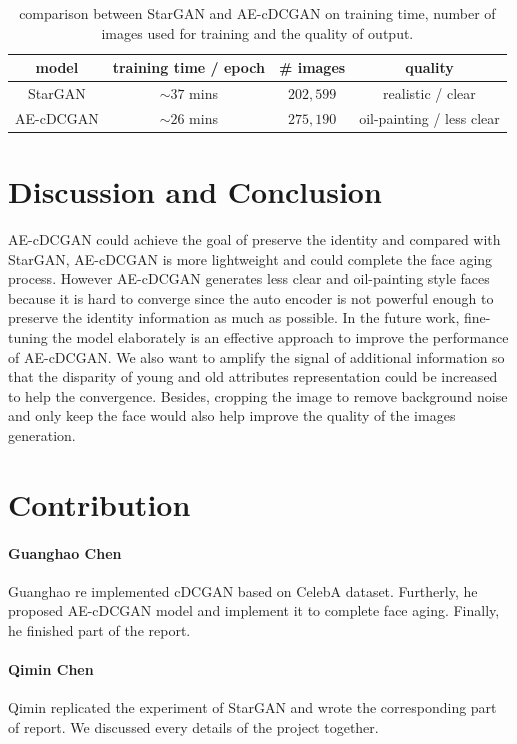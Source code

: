 \documentclass{article}
\begin{document}
\begin{table}[H]
\begin{center}
\setlength{\tabcolsep}{5mm}
\begin{tabular}{c|ccc}
\toprule
model & training time / epoch & \# images & quality \\
\midrule
StarGAN & $\sim 37$ mins & $202,599$ & realistic / clear \\
\midrule
AE-cDCGAN & $\sim 26$ mins & $275,190$ & oil-painting / less clear \\
\bottomrule
\end{tabular}
\caption{comparison between StarGAN and AE-cDCGAN on training time, number of images used for training and the quality of output.}
\label{comparison}
\end{center}
\end{table}

\section{Discussion and Conclusion}
AE-cDCGAN could achieve the goal of preserve the identity and compared with StarGAN, AE-cDCGAN is more lightweight and could complete the face aging process. However AE-cDCGAN generates less clear and oil-painting style faces because it is hard to converge since the auto encoder is not powerful enough to preserve the identity information as much as possible. In the future work, fine-tuning the model elaborately is an effective approach to improve the performance of AE-cDCGAN. We also want to amplify the signal of additional information so that the disparity of young and old attributes representation could be increased to help the convergence. Besides, cropping the image to remove background noise and only keep the face would also help improve the quality of the images generation.


\section{Contribution}
\paragraph{Guanghao Chen} Guanghao re implemented cDCGAN based on CelebA dataset. Furtherly, he proposed AE-cDCGAN model and implement it to complete face aging. Finally, he finished part of the report.

\paragraph{Qimin Chen} Qimin replicated the experiment of StarGAN and wrote the corresponding part of report. We discussed every details of the project together.
\end{document}
